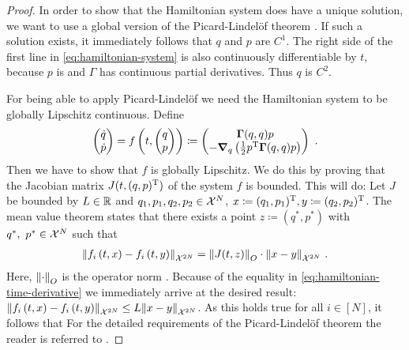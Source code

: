 \begin{proof}
	In order to show that the Hamiltonian system does have a unique solution, we want to use a global version of the Picard-Lindelöf theorem \cite[Theorem~1.2.3]{arino06}.
	If such a solution exists, it immediately follows that $q$ and $p$ are $C^1$.
	The right side of the first line in \cref{eq:hamiltonian-system} is also continuously differentiable by $t$, because $p$ is and $\Gamma$ has continuous partial derivatives.
	Thus $q$ is $C^2$.
	
	For being able to apply Picard-Lindelöf we need the Hamiltonian system to be globally Lipschitz continuous.
	Define
	\begin{equation}
	\label{eq:hamiltonian-time-derivative}
		\begin{pmatrix}
			\dot{q}\\ \dot{p}
		\end{pmatrix}
		= f\left(t, \begin{pmatrix}q\\ p\end{pmatrix}\right) 
		\coloneqq 			
		\begin{pmatrix}
			\mathbf{\Gamma}(q, q)p\\ 
			-\grad_q \left(\frac{1}{2} p^\mathrm{T} \mathbf{\Gamma}(q, q) p\right)
		\end{pmatrix} \ .
	\end{equation}
	Then we have to show that $f$ is globally Lipschitz.
	We do this by proving that the Jacobian matrix $J(t, (q, p)^{\mathrm{T}})$ of the system $f$ is bounded.
	This will do:
	Let $J$ be bounded by $L \in \mathbb{R}$ and $q_1, p_1, q_2, p_2 \in \mathcal{X}^N$, $x \coloneqq (q_1, p_1)^{\mathrm{T}}, y \coloneqq (q_2, p_2)^{\mathrm{T}}$.
	The mean value theorem states that there exists a point $z \coloneqq (q^\ast, p^\ast)$ with $q^\ast,\ p^\ast \in \mathcal{X}^N$ such that
	\begin{align}
		\norm{f_i\left(t, x\right) - f_i\left(t, y\right)}_{\mathcal{X}^{2N}}
		= \norm{J(t, z)}_O\cdot \norm{x-y}_{\mathcal{X}^{2N}} \ .
	\end{align}
	Here, $\norm{\cdot}_O$ is the operator norm \cite{conway07}.
	Because of the equality in \cref{eq:hamiltonian-time-derivative} we immediately arrive at the desired result:
	$\norm{f_i\left(t, x\right) - f_i\left(t, y\right)}_{\mathcal{X}^{2N}} \leq L \norm{x - y}_{\mathcal{X}^{2N}}$.
	As this holds true for all $i \in [N]$, it follows that
	For the detailed requirements of the Picard-Lindelöf theorem the reader is referred to \cite{arino06}.
	

\end{proof}
